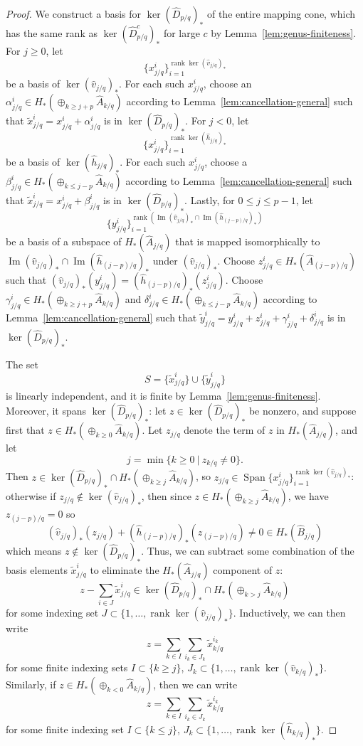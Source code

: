 \documentclass[10pt,a4paper]{amsart}
\DeclareMathOperator{\Span}{Span}
\DeclareMathOperator{\im}{Im}
\DeclareMathOperator{\rank}{rank}
\newcommand{\wh}{\widehat}
\newcommand{\wt}{\widetilde}
\begin{document}
\begin{proof}
We construct a basis for $\ker(\wh D_{p/q})_*$ of the entire mapping cone, which has the same rank as $\ker(\wh D_{p/q}^c)_*$ for large $c$ by Lemma~\ref{lem:genus-finiteness}. For $j\ge 0$, let
$$\{ x_{j/q}^i\}_{i=1}^{\rank\ker(\wh v_{j/q})_*}$$
be a basis of $\ker(\wh v_{j/q})_*$. For each such $x_{j/q}^i$, choose an $\alpha_{j/q}^i\in H_*(\oplus_{k\ge j+p}\wh A_{k/q})$ according to Lemma~\ref{lem:cancellation-general} such that $\wt x_{j/q}^i=x_{j/q}^i+\alpha_{j/q}^i$ is in $\ker(\wh D_{p/q})_*$. For $j<0$, let 
$$\{x_{j/q}^i\}_{i=1}^{\rank\ker(\wh h_{j/q})_*}$$ 
be a basis of $\ker(\wh h_{j/q})_*$. For each such $x_{j/q}^i$, choose a $\beta_{j/q}^i\in H_*(\oplus_{k\le j-p}\wh A_{k/q})$ according to Lemma~\ref{lem:cancellation-general} such that $\wt x_{j/q}^i=x_{j/q}^i+\beta_{j/q}^i$ is in $\ker(\wh D_{p/q})_*$. Lastly, for $0\le j\le p-1$, let 
$$\{y_{j/q}^i\}_{i=1}^{\rank\left(\im(\wh v_{j/q})_* \cap \im(\wh h_{(j-p)/q})_*\right)}$$
be a basis of a subspace of $H_*(\wh A_{j/q})$ that is mapped isomorphically to $\im(\wh v_{j/q})_* \cap \im(\wh h_{(j-p)/q})_*$ under $(\wh v_{j/q})_*$. Choose $z_{j/q}^i\in H_*(\wh A_{(j-p)/q})$ such that $(\wh v_{j/q})_*(y_{j/q}^i)=(\wh h_{(j-p)/q})_*(z_{j/q}^i)$. Choose $\gamma_{j/q}^i\in H_*(\oplus_{k\ge j+p}\wh A_{k/q})$ and $\delta_{j/q}^i\in H_*(\oplus_{k\le j-p}\wh A_{k/q})$ according to Lemma~\ref{lem:cancellation-general} such that $\wt y_{j/q}^i=y_{j/q}^i+z_{j/q}^i+\gamma_{j/q}^i+\delta_{j/q}^i$ is in $\ker(\wh D_{p/q})_*$.

The set $$S=\{\wt x_{j/q}^i\}\cup\{\wt y_{j/q}^i\}$$ is linearly independent, and it is finite by Lemma~\ref{lem:genus-finiteness}. Moreover, it spans $\ker(\wh D_{p/q})_*$: let $z\in\ker(\wh D_{p/q})_*$ be nonzero, and suppose first that $z\in H_*(\oplus_{k\ge 0}\wh A_{k/q})$. Let $z_{j/q}$ denote the term of $z$ in $H_*(\wh A_{j/q})$, and let
$$j=\min\{k\ge 0\ \vert\ z_{k/q}\ne 0\}.$$ Then $z\in\ker(\wh D_{p/q})_*\cap H_*(\oplus_{k\ge j}\wh A_{k/q})$, so $z_{j/q}\in\Span \{x_{j/q}^i\}_{i=1}^{\rank\ker(\wh v_{j/q})_*}$: otherwise if $z_{j/q}\notin\ker(\wh v_{j/q})_*$, then since $z\in H_*(\oplus_{k\ge j}\wh A_{k/q})$, we have $z_{(j-p)/q}=0$ so $$(\wh v_{j/q})_*(z_{j/q})+(\wh h_{(j-p)/q})_*(z_{(j-p)/q})\ne 0\in H_*(\wh B_{j/q})$$ which means $z\notin\ker(\wh D_{p/q})_*$. Thus, we can subtract some combination of the basis elements $\wt x_{j/q}^i$ to eliminate the $H_*(\wh A_{j/q})$ component of $z$:
$$z-\sum_{i\in J}\wt x_{j/q}^i\in\ker(\wh D_{p/q})_*\cap H_*(\oplus_{k>j}\wh A_{k/q})$$ for some indexing set $J\subset\{1,\dots,\rank\ker(\wh v_{j/q})_*\}$. Inductively, we can then write 
$$z=\sum_{k\in I}\sum_{i_k\in J_k}\wt x_{k/q}^{i_k}$$ for some finite indexing sets $I\subset\{k\ge j\}$, $J_k\subset\{1,\dots,\rank\ker(\wh v_{k/q})_*\}$. Similarly, if $z\in H_*(\oplus_{k<0}\wh A_{k/q})$, then we can write
$$z=\sum_{k\in I}\sum_{i_k\in J_k}\wt x_{k/q}^{i_k}$$ for some finite indexing set $I\subset\{k\le j\}$, $J_k\subset\{1,\dots,\rank\ker(\wh h_{k/q})_*\}$.


\end{proof}
\end{document}
